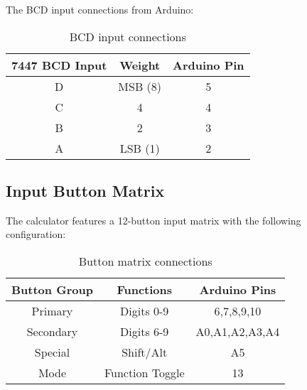 \documentclass[journal]{IEEEtran}
\begin{document}
The BCD input connections from Arduino:

\begin{table}[h]
    \centering
    \begin{tabular}{|c|c|c|}
        \hline
        \textbf{7447 BCD Input} & \textbf{Weight} & \textbf{Arduino Pin} \\
        \hline
        D & MSB (8) & 5 \\
        C & 4 & 4 \\
        B & 2 & 3 \\
        A & LSB (1) & 2 \\
        \hline
    \end{tabular}
    \caption{BCD input connections}
    \label{tab:bcd_inputs}
\end{table}

\subsection{Input Button Matrix}
The calculator features a 12-button input matrix with the following configuration:

\begin{table}[h]
    \centering
    \begin{tabular}{|c|c|c|}
        \hline
        \textbf{Button Group} & \textbf{Functions} & \textbf{Arduino Pins} \\
        \hline
        Primary & Digits 0-9 & 6,7,8,9,10 \\
        Secondary & Digits 6-9 & A0,A1,A2,A3,A4 \\
        Special & Shift/Alt & A5 \\
        Mode & Function Toggle & 13 \\
        \hline
    \end{tabular}
    \caption{Button matrix connections}
    \label{tab:button_matrix}
\end{table}
\end{document}
